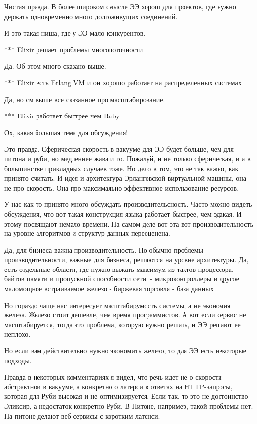 \documentclass[10pt]{beamer}
\begin{document}
Чистая правда. В более широком смысле ЭЭ хорош для проектов, где нужно держать одновременно много долгоживущих соединений.

И это такая ниша, где у ЭЭ мало конкурентов.


*** Elixir решает проблемы многопоточности

Да. Об этом много сказано выше.


*** Elixir есть Erlang VM и он хорошо работает на распределенных системах

Да, но см выше все сказанное про масштабирование.


*** Elixir работает быстрее чем Ruby

Ох, какая большая тема для обсуждения!

Это правда. Сферическая скорость в вакууме для ЭЭ будет больше, чем для питона и руби, но медленнее жава и го.
Пожалуй, и не только сферическая, и а в большинстве прикладных случаев тоже.
Но дело в том, это не так важно, как принято считать.
И идея и архитектура Эрланговской виртуальной машины, она не про скорость. Она про максимально эффективное использование ресурсов.

У нас как-то принято много обсуждать производительсность.
Часто можно видеть обсуждения, что вот такая конструкция языка работает быстрее, чем эдакая. И этому посвящают немало времени.
На самом деле вот эта вот производительность на уровне алгоритмов и структур данных переоценена.

Да, для бизнеса важна производительность. Но обычно проблемы производительности, важные для бизнеса, решаются на уровне архитектуры.
Да, есть отдельные области, где нужно выжать максимум из тактов процессора, байтов памяти и пропускной способности сети:
- микроконтроллеры и другое маломощное встраиваемое железо
- биржевая торговля
- база данных

Но гораздо чаще нас интересует масштабирумость системы, а не экономия железа.
Железо стоит дешевле, чем время программистов. А вот если сервис не масштабируется, тогда это проблема, которую нужно решать, и ЭЭ решают ее неплохо.

Но если вам действительно нужно экономить железо, то для ЭЭ есть некоторые подходы.

Правда в некоторых комментариях я видел, что речь идет не о скорости абстрактной в вакууме,
а конкретно о латерси в ответах на HTTP-запросы, которая для Руби высокая и не оптимизируется.
Если так, то это не достоинство Эликсир, а недостаток конкретно Руби.
В Питоне, например, такой проблемы нет. На питоне делают веб-сервисы с коротким латенси.
\end{document}
